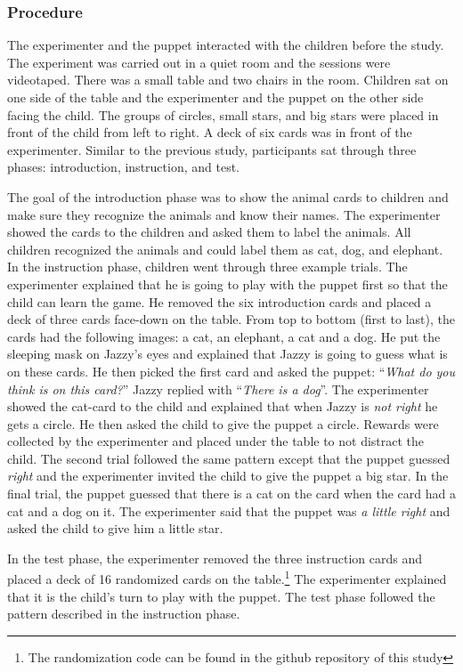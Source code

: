 \documentclass[10pt, letterpaper]{article}
\begin{document}
\subsubsection{Procedure}\label{procedure-1}

The experimenter and the puppet interacted with the children before the
study. The experiment was carried out in a quiet room and the sessions
were videotaped. There was a small table and two chairs in the room.
Children sat on one side of the table and the experimenter and the
puppet on the other side facing the child. The groups of circles, small
stars, and big stars were placed in front of the child from left to
right. A deck of six cards was in front of the experimenter. Similar to
the previous study, participants sat through three phases: introduction,
instruction, and test.

The goal of the introduction phase was to show the animal cards to
children and make sure they recognize the animals and know their names.
The experimenter showed the cards to the children and asked them to
label the animals. All children recognized the animals and could label
them as cat, dog, and elephant. In the instruction phase, children went
through three example trials. The experimenter explained that he is
going to play with the puppet first so that the child can learn the
game. He removed the six introduction cards and placed a deck of three
cards face-down on the table. From top to bottom (first to last), the
cards had the following images: a cat, an elephant, a cat and a dog. He
put the sleeping mask on Jazzy's eyes and explained that Jazzy is going
to guess what is on these cards. He then picked the first card and asked
the puppet: ``\emph{What do you think is on this card?}'' Jazzy replied
with ``\emph{There is a dog}''. The experimenter showed the cat-card to
the child and explained that when Jazzy is \emph{not right} he gets a
circle. He then asked the child to give the puppet a circle. Rewards
were collected by the experimenter and placed under the table to not
distract the child. The second trial followed the same pattern except
that the puppet guessed \emph{right} and the experimenter invited the
child to give the puppet a big star. In the final trial, the puppet
guessed that there is a cat on the card when the card had a cat and a
dog on it. The experimenter said that the puppet was \emph{a little
right} and asked the child to give him a little star.

In the test phase, the experimenter removed the three instruction cards
and placed a deck of 16 randomized cards on the table.\footnote{The
  randomization code can be found in the github repository of this study}
The experimenter explained that it is the child's turn to play with the
puppet. The test phase followed the pattern described in the instruction
phase.
\end{document}
